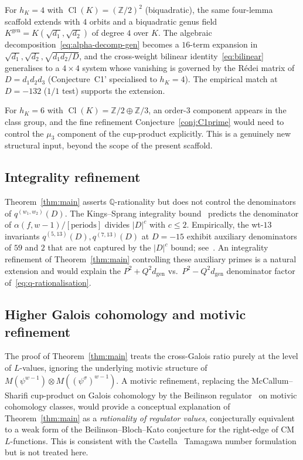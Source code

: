 \documentclass[11pt,a4paper]{amsart}
\theoremstyle{plain}
\theoremstyle{definition}
\DeclareMathOperator{\Cl}{Cl}
\newcommand{\Q}{\mathbb{Q}}
\newcommand{\Z}{\mathbb{Z}}
\newcommand{\Kgen}{K^{\mathrm{gen}}}
\newcommand{\absD}{\lvert D\rvert}
\newcommand{\qstr}[2]{q^{(#1,#2)}}
\newcommand{\dgen}{d_{\mathrm{gen}}}
\begin{document}
For $h_K = 4$ with $\Cl(K) = (\Z/2)^2$ (biquadratic), the same
four-lemma scaffold extends with $4$ orbits and a biquadratic
genus field $\Kgen = K(\sqrt{d_1}, \sqrt{d_2})$ of degree $4$ over
$K$.  The algebraic decomposition~\eqref{eq:alpha-decomp-gen} becomes a
$16$-term expansion in $\sqrt{d_1}, \sqrt{d_2}, \sqrt{d_1 d_2 / D}$,
and the cross-weight bilinear identity~\eqref{eq:bilinear} generalises
to a $4 \times 4$ system whose vanishing is governed by the
R\'edei matrix of $D = d_1 d_2 d_3$ (Conjecture~C1' specialised to
$h_K = 4$).  The empirical match at $D = -132$
\cite[\S 3.9]{Remondiere2026P6} ($1/1$ test) supports the extension.

For $h_K = 6$ with $\Cl(K) = \Z/2 \oplus \Z/3$, an order-$3$ component
appears in the class group, and the fine refinement
Conjecture~\ref{conj:C1prime} would need to control the
$\mu_3$ component of the cup-product explicitly.  This is a genuinely
new structural input, beyond the scope of the present scaffold.

\subsection{Integrality refinement}

Theorem~\ref{thm:main} asserts $\Q$-rationality but does not
control the denominators of $\qstr{w_1}{w_2}(D)$.  The
Kings--Sprang integrality bound~\cite[Thm.~4.10]{KingsSprang2025}
predicts the denominator of $\alpha(f, w-1) / [\text{periods}]$ divides
$\absD^c$ with $c \le 2$.  Empirically, the wt-$13$ invariants
$\qstr{5}{13}(D), \qstr{7}{13}(D)$ at $D = -15$ exhibit auxiliary
denominators of $59$ and $2$ that are not captured by the
$\absD^c$ bound; see~\cite[\S 1.4, Rk.~1]{Remondiere2026P6}.  An
integrality refinement of Theorem~\ref{thm:main} controlling these
auxiliary primes is a natural extension and would explain the
$P^2 + Q^2 \dgen$ vs.\ $P^2 - Q^2 \dgen$ denominator factor
of~\eqref{eq:q-rationalisation}.

\subsection{Higher Galois cohomology and motivic refinement}

The proof of Theorem~\ref{thm:main} treats the cross-Galois ratio
purely at the level of $L$-values, ignoring the underlying motivic
structure of $M(\psi^{w-1}) \otimes M((\psi^\sigma)^{w-1})$.  A
motivic refinement, replacing the McCallum--Sharifi
cup-product on Galois cohomology by the Beilinson
regulator~\cite{Beilinson1985} on motivic cohomology classes, would
provide a conceptual explanation of Theorem~\ref{thm:main} as a
\emph{rationality of regulator values}, conjecturally equivalent to a
weak form of the Beilinson--Bloch--Kato conjecture for the
right-edge of CM $L$-functions.  This is consistent with the
Castella~\cite{Castella2025} Tamagawa number formulation but is not
treated here.
\end{document}
